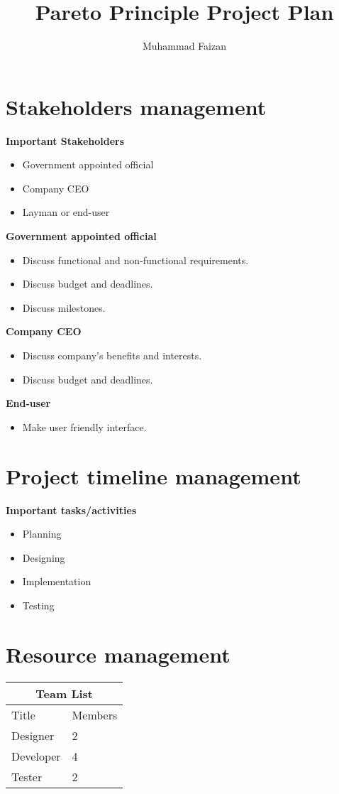\documentclass{article}
\title{Pareto Principle Project Plan}
\author{Muhammad Faizan}
\begin{document}
	\maketitle
	\newpage
	
	\tableofcontents
	\newpage
	
	\section{Stakeholders management}
	\textbf{Important Stakeholders}
		\begin{itemize}
			\item Government appointed official
			\item Company CEO
			\item Layman or end-user
		\end{itemize}
	
	\textbf{Government appointed official}
		\begin{itemize}
			\item Discuss functional and non-functional requirements.
			\item Discuss budget and deadlines.
			\item Discuss milestones.
		\end{itemize}
	\textbf{Company CEO}
		\begin{itemize}
			\item Discuss company's benefits and interests.
			\item Discuss budget and deadlines.
		\end{itemize}
	\textbf{End-user}
		\begin{itemize}
			\item Make user friendly interface.
		\end{itemize}
	
	\section{Project timeline management}
		\textbf{Important tasks/activities}
		\begin{itemize}
			\item Planning
			\item Designing
			\item Implementation
			\item Testing
		\end{itemize}
	\section{Resource management}
			\begin{tabular}{ |p{6cm}||p{2cm}|  }
			\hline
			\multicolumn{2}{|c|}{Team List} \\
			\hline
			Title& Members \\
			\hline
			 Designer & 2\\
			 Developer & 4\\
			 Tester & 2 \\
			
			\hline
		\end{tabular}
\end{document}
